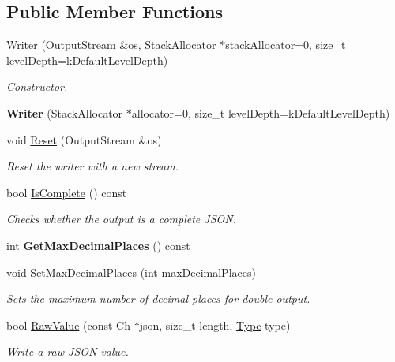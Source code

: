 \subsection*{Public Member Functions}
\begin{DoxyCompactItemize}
\item 
\hyperlink{class_writer_af4f54830d6927d9daf5bd53bfd134dd3}{Writer} (Output\+Stream \&os, Stack\+Allocator $\ast$stack\+Allocator=0, size\+\_\+t level\+Depth=k\+Default\+Level\+Depth)
\begin{DoxyCompactList}\small\item\em Constructor. \end{DoxyCompactList}\item 
\mbox{\label{class_writer_a7b885cea71542fc436be80eff447fb64}} 
{\bfseries Writer} (Stack\+Allocator $\ast$allocator=0, size\+\_\+t level\+Depth=k\+Default\+Level\+Depth)
\item 
void \hyperlink{class_writer_a8b53e8f137f7fcf694f5500711b3f58d}{Reset} (Output\+Stream \&os)
\begin{DoxyCompactList}\small\item\em Reset the writer with a new stream. \end{DoxyCompactList}\item 
bool \hyperlink{class_writer_a07d74d36dd3191b06e0aab678c246157}{Is\+Complete} () const
\begin{DoxyCompactList}\small\item\em Checks whether the output is a complete J\+S\+ON. \end{DoxyCompactList}\item 
\mbox{\label{class_writer_ad35ddb56c6969d9584bf1e73bebda5ab}} 
int {\bfseries Get\+Max\+Decimal\+Places} () const
\item 
void \hyperlink{class_writer_a58e3f94dc5af1432a8eace5ba427eca7}{Set\+Max\+Decimal\+Places} (int max\+Decimal\+Places)
\begin{DoxyCompactList}\small\item\em Sets the maximum number of decimal places for double output. \end{DoxyCompactList}\item 
bool \hyperlink{class_writer_ae0d1615104e4e88040b9640e6784008a}{Raw\+Value} (const Ch $\ast$json, size\+\_\+t length, \hyperlink{rapidjson_8h_a1d1cfd8ffb84e947f82999c682b666a7}{Type} type)
\begin{DoxyCompactList}\small\item\em Write a raw J\+S\+ON value. \end{DoxyCompactList}\end{DoxyCompactItemize}
